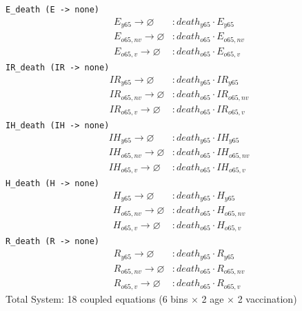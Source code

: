 \documentclass{article}
\begin{document}
\noindent\texttt{E\_death (E -\textgreater{} none)}
\begin{align*}
E_{y65} \to \varnothing &: death_{y65} \cdot E_{y65} \\
E_{o65,nv} \to \varnothing &: death_{o65} \cdot E_{o65,nv} \\
E_{o65,v} \to \varnothing &: death_{o65} \cdot E_{o65,v}
\end{align*}
\noindent\texttt{IR\_death (IR -\textgreater{} none)}
\begin{align*}
IR_{y65} \to \varnothing &: death_{y65} \cdot IR_{y65} \\
IR_{o65,nv} \to \varnothing &: death_{o65} \cdot IR_{o65,nv} \\
IR_{o65,v} \to \varnothing &: death_{o65} \cdot IR_{o65,v}
\end{align*}
\noindent\texttt{IH\_death (IH -\textgreater{} none)}
\begin{align*}
IH_{y65} \to \varnothing &: death_{y65} \cdot IH_{y65} \\
IH_{o65,nv} \to \varnothing &: death_{o65} \cdot IH_{o65,nv} \\
IH_{o65,v} \to \varnothing &: death_{o65} \cdot IH_{o65,v}
\end{align*}
\noindent\texttt{H\_death (H -\textgreater{} none)}
\begin{align*}
H_{y65} \to \varnothing &: death_{y65} \cdot H_{y65} \\
H_{o65,nv} \to \varnothing &: death_{o65} \cdot H_{o65,nv} \\
H_{o65,v} \to \varnothing &: death_{o65} \cdot H_{o65,v}
\end{align*}
\noindent\texttt{R\_death (R -\textgreater{} none)}
\begin{align*}
R_{y65} \to \varnothing &: death_{y65} \cdot R_{y65} \\
R_{o65,nv} \to \varnothing &: death_{o65} \cdot R_{o65,nv} \\
R_{o65,v} \to \varnothing &: death_{o65} \cdot R_{o65,v}
\end{align*}
Total System: 18 coupled equations (6 bins $\times$ 2 age $\times$ 2 vaccination)
\end{document}
